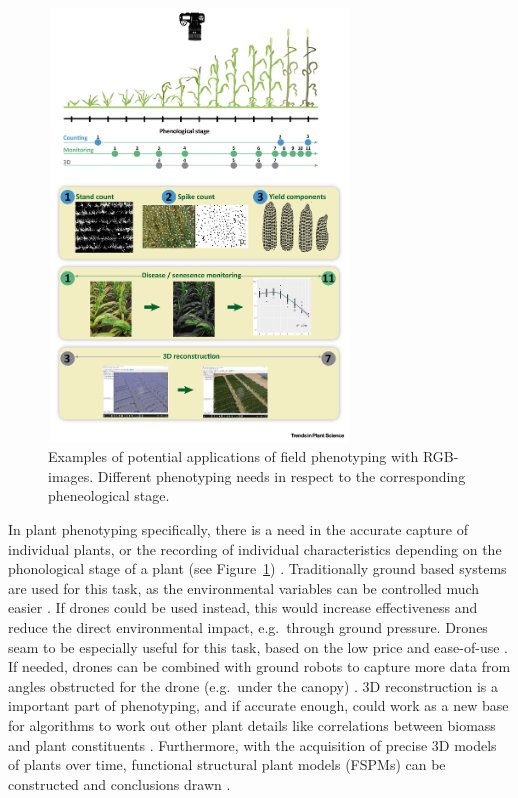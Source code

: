 \documentclass[conference,]{IEEEtran}
\begin{document}
\begin{figure}

{\centering \includegraphics[width=8cm,height=11.5cm]{images/pheneostages.jpg}

}

\caption{\label{fig-pheneostages}Examples of potential applications of
field phenotyping with RGB-images. Different phenotyping needs in
respect to the corresponding pheneological stage. \autocite{araus2018}}

\end{figure}

In plant phenotyping specifically, there is a need in the accurate
capture of individual plants, or the recording of individual
characteristics depending on the phonological stage of a plant (see
Figure~\ref{fig-pheneostages}) \autocite{araus2018}. Traditionally
ground based systems are used for this task, as the environmental
variables can be controlled much easier \autocite{yang2020}. If drones
could be used instead, this would increase effectiveness and reduce the
direct environmental impact, e.g.~through ground pressure. Drones seam
to be especially useful for this task, based on the low price and
ease-of-use \autocite{guo2021}. If needed, drones can be combined with
ground robots to capture more data from angles obstructed for the drone
(e.g.~under the canopy) \autocite{gao2021}. 3D reconstruction is a
important part of phenotyping, and if accurate enough, could work as a
new base for algorithms to work out other plant details like
correlations between biomass and plant constituents \autocite{xiao2020}.
Furthermore, with the acquisition of precise 3D models of plants over
time, functional structural plant models (FSPMs) can be constructed and
conclusions drawn \autocite{soualiou2021}.
\end{document}
